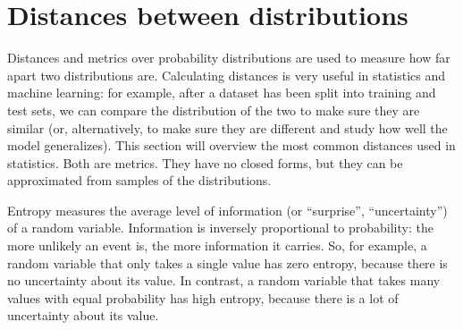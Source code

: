 \section{Distances between distributions}

Distances and metrics over probability distributions are used to measure how far apart two distributions are. Calculating distances is very useful in statistics and machine learning: for example, after a dataset has been split into training and test sets, we can compare the distribution of the two to make sure they are similar (or, alternatively, to make sure they are different and study how well the model generalizes). This section will overview the most common distances used in statistics.
Both are metrics. They have no closed forms, but they can be approximated from samples of the distributions.

Entropy measures the average level of information (or ``surprise'', ``uncertainty'') of a random variable. Information is inversely proportional to probability: the more unlikely an event is, the more information it carries. So, for example, a random variable that only takes a single value has zero entropy, because there is no uncertainty about its value. In contrast, a random variable that takes many values with equal probability has high entropy, because there is a lot of uncertainty about its value.


